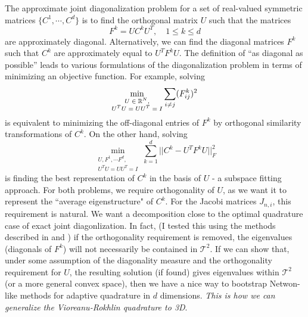 The approximate joint diagonalization problem for a set of real-valued symmetric matrices $\{C^1,\cdots,C^d\}$ is to find the orthogonal matrix $U$ such that the matrices 
\begin{equation}
	F^k = UC^kU^T, \quad 1\leq k \leq d
\end{equation}
are approximately diagonal. Alternatively, we can find the diagonal matrices $F^k$ such that $C^k$ are approximately equal to $U^TF^kU$. The definition of ``as diagonal as possible'' leads to various formulations of the diagonalization problem in terms of minimizing an objective function. For example, solving
\begin{equation}
	\min_{\substack{\text{$U\in \mathbb{R}^N$},\\ \text{$U^TU=UU^T=I$}}}\sum_{i\neq j}(F^k_{ij})^2
\end{equation}
is equivalent to minimizing the off-diagonal entries of $F^k$ by orthogonal similarity transformations of $C^k$. On the other hand, solving
\begin{equation}
	\min_{\substack{\text{$U,F^1,\cdots F^d$},\\ \text{$U^TU=UU^T=I$}}} \sum_{k=1}^d \big|\big|C^k-U^TF^k U\big|\big|_F^2
\end{equation}
is finding the best representation of $C^k$ in the basis of $U$ - a subspace fitting approach. For both problems, we require orthogonality of $U$, as we want it to represent the ``average eigenstructure" of $C^k$. For the Jacobi matrices $J_{n,i}$, this requirement is natural. We want a decomposition close to the optimal quadrature case of exact joint diagonlization. In fact, (I tested this using the methods described in \cite{bss} and \cite{jevd}) if the orthogonality requirement is removed, the eigenvalues (diagonals of $F^k$) will not necessarily be contained in $\mathcal{T}^2$. \color{red} If we can show that, under some assumption of the diagonality measure and the orthogonality requirement for $U$, the resulting solution (if found) gives eigenvalues within $\mathcal{T}^2$ (or a more general convex space), then we have a nice way to bootstrap Netwon-like methods for adaptive quadrature in $d$ dimensions.\color{black} \emph{ This is how we can generalize the Vioreanu-Rokhlin quadrature to 3D}.

